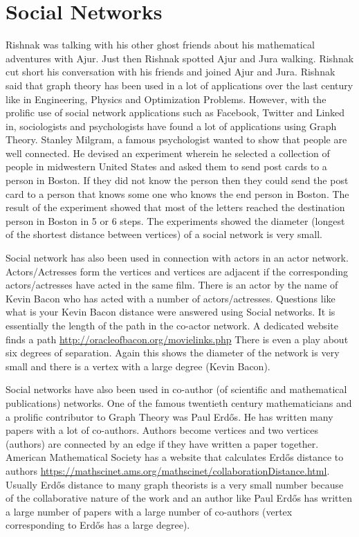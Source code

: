 \chapter{Social Networks}

 Rishnak was talking with his other ghost friends about his mathematical adventures with Ajur. Just then Rishnak spotted Ajur and Jura walking. Rishnak cut short his conversation with his friends and joined Ajur and Jura. Rishnak said that graph theory has been used in a lot of applications over the last century like in Engineering, Physics and Optimization Problems. However, with the prolific use of social network applications such as Facebook, Twitter and Linked in, sociologists and psychologists have found a lot of applications using Graph Theory.  
Stanley Milgram, a famous psychologist wanted to show that people are well connected. He devised an experiment wherein he selected a collection of people in midwestern United States and asked them to send post cards to a person in Boston. If they did not know the person then they could send the post card to a person that knows some one who knows the end person in Boston. The result of the experiment showed that most of the letters reached the destination person in Boston in 5 or 6 steps. The experiments showed the diameter (longest of the shortest distance between vertices) of a social network is very small.

Social network has also been used in connection with actors in an actor network. Actors/Actresses form the vertices and vertices are adjacent if the corresponding actors/actresses have acted in the same film. There is an actor by the name of Kevin Bacon who has acted with a number of actors/actresses. Questions like what is your Kevin Bacon distance were answered using Social networks. It is essentially the length of the path  in the co-actor network. A dedicated website finds a path \url{http://oracleofbacon.org/movielinks.php} There is even a play about six degrees of separation. Again this shows the diameter of the network is very small and there is a vertex with a large degree (Kevin Bacon).

Social networks have also been used in co-author (of scientific and mathematical publications) networks. One of the famous twentieth century mathematicians and a prolific contributor to Graph Theory was Paul Erd\H{o}s. He has written many papers with a lot of co-authors. Authors become vertices and two vertices (authors) are connected by an edge if they have written a paper together. American Mathematical Society has a website that calculates Erd\H{o}s distance to authors
\url{https://mathscinet.ams.org/mathscinet/collaborationDistance.html}. Usually Erd\H{o}s distance to many graph theorists is a very small number because of the collaborative nature of the work and an author like Paul Erd\H{o}s has written a large number of papers with a large number of co-authors (vertex corresponding to Erd\H{o}s has a large degree).

